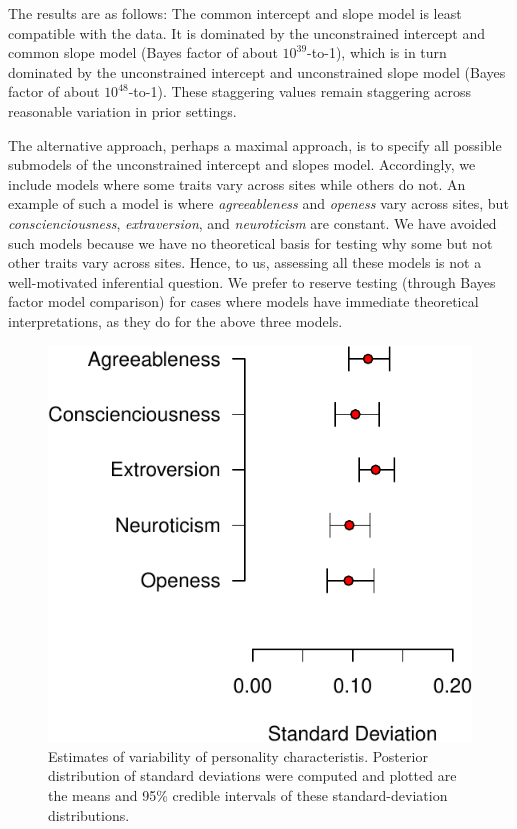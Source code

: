 \documentclass[english,man]{apa6}
\theoremstyle{definition}
\theoremstyle{definition}
\theoremstyle{definition}
\theoremstyle{remark}
\begin{document}
The results are as follows: The common intercept and slope model is
least compatible with the data. It is dominated by the unconstrained
intercept and common slope model (Bayes factor of about
\(10^{39}\)-to-1), which is in turn dominated by the unconstrained
intercept and unconstrained slope model (Bayes factor of about
\(10^{48}\)-to-1). These staggering values remain staggering across
reasonable variation in prior settings.

The alternative approach, perhaps a maximal approach, is to specify all
possible submodels of the unconstrained intercept and slopes model.
Accordingly, we include models where some traits vary across sites while
others do not. An example of such a model is where \emph{agreeableness}
and \emph{openess} vary across sites, but \emph{conscienciousness},
\emph{extraversion}, and \emph{neuroticism} are constant. We have
avoided such models because we have no theoretical basis for testing why
some but not other traits vary across sites. Hence, to us, assessing all
these models is not a well-motivated inferential question. We prefer to
reserve testing (through Bayes factor model comparison) for cases where
models have immediate theoretical interpretations, as they do for the
above three models.

\begin{figure}[htbp]
\centering
\includegraphics{p_files/figure-latex/corkEst2-1.pdf}
\caption{\label{fig:corkEst2}Estimates of variability of personality
characteristis. Posterior distribution of standard deviations were
computed and plotted are the means and 95\% credible intervals of these
standard-deviation distributions.}
\end{figure}
\end{document}
